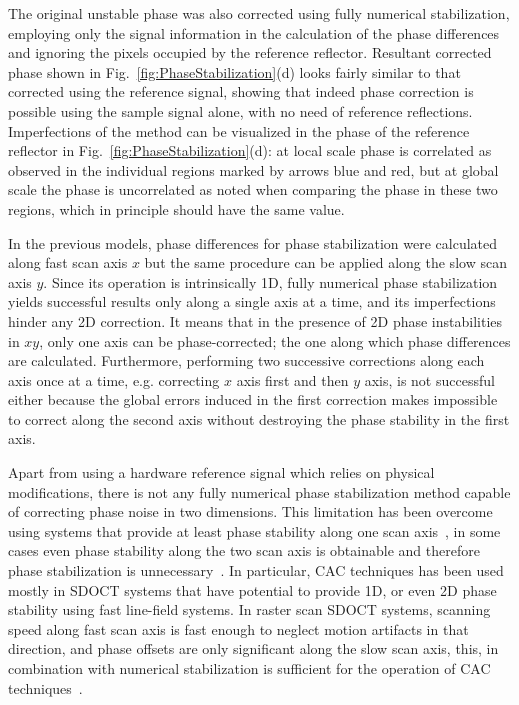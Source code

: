 The original unstable phase was also corrected using fully numerical stabilization, employing only the signal information in the calculation of the phase differences and ignoring the pixels occupied by the reference reflector. Resultant corrected phase shown in Fig.~\ref{fig:PhaseStabilization}(d) looks fairly similar to that corrected using the reference signal, showing that indeed phase correction is possible using the sample signal alone, with no need of reference reflections. Imperfections of the method can be visualized in the phase of the reference reflector in Fig.~\ref{fig:PhaseStabilization}(d): at local scale phase is correlated as observed in the individual regions marked by arrows blue and red, but at global scale the phase is uncorrelated as noted when comparing the phase in these two regions, which in  principle should have the same value.

\FloatBarrier

In the previous models, phase differences for phase stabilization were calculated along fast scan axis $x$ but the same procedure can be applied along the slow scan axis $y$. Since its operation is intrinsically 1D, fully numerical phase stabilization yields successful results only along a single axis at a time, and its imperfections hinder any 2D correction. It means that in the presence of 2D phase instabilities in $xy$, only one axis can be phase-corrected; the one along which phase differences are calculated. Furthermore, performing two successive corrections along each axis once at a time, e.g. correcting $x$ axis first and then $y$ axis, is not successful either because the global errors induced in the first correction makes impossible to correct along the second axis without destroying the phase stability in the first axis.

Apart from using a hardware reference signal which relies on physical modifications, there is not any fully numerical phase stabilization method capable of correcting phase noise in two dimensions. This limitation has been overcome using systems that provide at least phase stability along one scan axis~\cite{Ginner2017_Noniterative, Shemonski2014_Threedimensional, Fechtig2015_Highspeed, Ginner2018_Holographic, Leitgeb2016_Digital,Yasuno2006_Noniterative, South2019_Local}, in some cases even phase stability along the two scan axis is obtainable and therefore phase stabilization is unnecessary~\cite{Kumar2013_Subaperture, Hillmann2016_Aberrationfree, Pande2016_Automated, Kumar2015_Anisotropic,Sudkamp2018_Simple}. In particular, CAC techniques has been used mostly in SDOCT systems that have potential to provide 1D, or even 2D phase stability using fast line-field systems. In raster scan SDOCT systems, scanning speed along fast scan axis is fast enough to neglect motion artifacts in that direction, and phase offsets are only significant along the slow scan axis, this, in combination with numerical stabilization is sufficient for the operation of CAC techniques~\cite{Shemonski2014_Threedimensional}.

